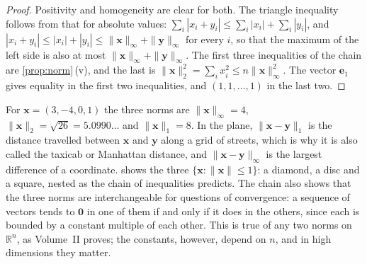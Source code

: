 \begin{proof}
Positivity and homogeneity are clear for both. The triangle inequality follows from that for absolute values: $\sum_i|x_i+y_i|\le\sum_i|x_i|+\sum_i|y_i|$, and $|x_i+y_i|\le|x_i|+|y_i|\le\|\mathbf x\|_\infty+\|\mathbf y\|_\infty$ for every $i$, so that the maximum of the left side is also at most $\|\mathbf x\|_\infty+\|\mathbf y\|_\infty$. The first three inequalities of the chain are \cref{prop:norm}\,(v), and the last is $\|\mathbf x\|_2^2=\sum_ix_i^2\le n\|\mathbf x\|_\infty^2$. The vector $\mathbf e_1$ gives equality in the first two inequalities, and $(1,1,\ldots,1)$ in the last two.
\end{proof}

For $\mathbf x=(3,-4,0,1)$ the three norms are $\|\mathbf x\|_\infty=4$, $\|\mathbf x\|_2=\sqrt{26}=5.0990\ldots$ and $\|\mathbf x\|_1=8$. In the plane, $\|\mathbf x-\mathbf y\|_1$ is the distance travelled between $\mathbf x$ and $\mathbf y$ along a grid of streets, which is why it is also called the taxicab or Manhattan distance, and $\|\mathbf x-\mathbf y\|_\infty$ is the largest difference of a coordinate.  shows the three  $\{\mathbf x: \|\mathbf x\|\le1\}$: a diamond, a disc and a square, nested as the chain of inequalities predicts. The chain also shows that the three norms are interchangeable for questions of convergence: a sequence of vectors tends to $\mathbf 0$ in one of them if and only if it does in the others, since each is bounded by a constant multiple of each other. This is true of any two norms on $\mathbb R^n$, as Volume~II proves; the constants, however, depend on $n$, and in high dimensions they matter.

\begin{figure}
\end{figure}

